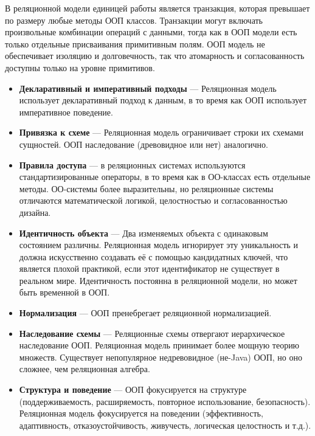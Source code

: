 
        В реляционной модели единицей работы является транзакция, которая превышает по размеру любые методы ООП классов. Транзакции могут включать произвольные комбинации операций с данными, тогда как в ООП модели есть только отдельные присваивания примитивным полям. ООП модель не обеспечивает изоляцию и долговечность, так что атомарность и согласованность доступны только на уровне примитивов.


        \begin{itemize}
            \item \textbf{Декларативный и императивный подходы} — Реляционная модель использует декларативный подход к данным, в то время как ООП использует императивное поведение.
            
            \item \textbf{Привязка к схеме} — Реляционная модель ограничивает строки их схемами сущностей. ООП наследование (древовидное или нет) аналогично.
            
            \item \textbf{Правила доступа} — в реляционных системах используются стандартизированные операторы, в то время как в ОО-классах есть отдельные методы. ОО-системы более выразительны, но реляционные системы отличаются математической логикой, целостностью и согласованностью дизайна.
            
            \item \textbf{Идентичность объекта} — Два изменяемых объекта с одинаковым состоянием различны. Реляционная модель игнорирует эту уникальность и должна искусственно создавать её с помощью кандидатных ключей, что является плохой практикой, если этот идентификатор не существует в реальном мире. Идентичность постоянна в реляционной модели, но может быть временной в ООП.
            
            \item \textbf{Нормализация} — ООП пренебрегает реляционной нормализацией.
            
            \item \textbf{Наследование схемы} — Реляционные схемы отвергают иерархическое наследование ООП. Реляционная модель принимает более мощную теорию множеств. Существует непопулярное недревовидное (не-Java) ООП, но оно сложнее, чем реляционная алгебра.
            
            \item \textbf{Структура и поведение} — ООП фокусируется на структуре (поддерживаемость, расширяемость, повторное использование, безопасность). Реляционная модель фокусируется на поведении (эффективность, адаптивность, отказоустойчивость, живучесть, логическая целостность и т.д.).
        \end{itemize}

